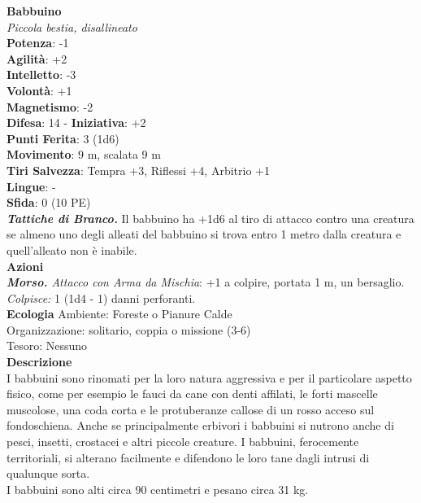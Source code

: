 \begin{multicols}{2}
\medskip\textbf{Babbuino}\\
\emph{Piccola bestia, disallineato}\\
\textbf{Potenza}: -1\\
\textbf{Agilità}: +2\\
\textbf{Intelletto}: -3\\
\textbf{Volontà}: +1\\
\textbf{Magnetismo}: -2\\
\textbf{Difesa}: 14 - \textbf{Iniziativa}: +2\\
\textbf{Punti Ferita}: 3 (1d6)\\
\textbf{Movimento}: 9 m, scalata 9 m\\
\textbf{Tiri Salvezza}: Tempra +3, Riflessi +4, Arbitrio +1\\
\textbf{Lingue}: -\\
\textbf{Sfida}: 0 (10 PE)\smallskip\\
\emph{\textbf{Tattiche di Branco.}} Il babbuino ha +1d6 al tiro di attacco contro una creatura se almeno uno degli alleati del babbuino si trova entro 1 metro dalla creatura e quell'alleato non è inabile.\\
\smallskip\textbf{Azioni}\\
\emph{\textbf{Morso.} Attacco con Arma da Mischia}: +1 a colpire, portata 1 m, un bersaglio.\\
\emph{Colpisce:} 1 (1d4 - 1) danni perforanti.\\
\textbf{Ecologia}
Ambiente: Foreste o Pianure Calde\\
Organizzazione: solitario, coppia o missione (3-6)\\
Tesoro: Nessuno\\
\textbf{Descrizione}\\
I babbuini sono rinomati per la loro natura aggressiva e per il particolare aspetto fisico, come per esempio le fauci da cane con denti affilati, le forti mascelle muscolose, una coda corta e le protuberanze callose di un rosso acceso sul fondoschiena. Anche se principalmente erbivori i babbuini si nutrono anche di pesci, insetti, crostacei e altri piccole creature. I babbuini, ferocemente territoriali, si alterano facilmente e difendono le loro tane dagli intrusi di qualunque sorta.\\

I babbuini sono alti circa 90 centimetri e pesano circa 31 kg.\\


\end{multicols}
